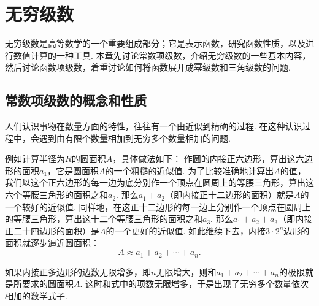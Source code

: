 \begingroup
\def\s{\sum\limits_{i=1}^{\infty}}
\def\sn{\sum\limits_{i=1}^n}
\def\l{\lim\limits_{n\to\infty}}
\def\tint{\int_{-\pi}^{\pi}}

\chapter{无穷级数}
无穷级数是高等数学的一个重要组成部分；它是表示函数，研究函数性质，以及进行数值计算的一种工具.
本章先讨论常数项级数，介绍无穷级数的一些基本内容，然后讨论函数项级数，着重讨论如何将函数展开成幂级数和三角级数的问题.

\section{常数项级数的概念和性质}
人们认识事物在数量方面的特性，往往有一个由近似到精确的过程.
在这种认识过程中，会遇到由有限个数量相加到无穷多个数量相加的问题.

例如计算半径为\(R\)的圆面积\(A\)，具体做法如下：
作圆的内接正六边形，算出这六边形的面积\(a_1\)，它是圆面积\(A\)的一个粗糙的近似值.
为了比较准确地计算出\(A\)的值，我们以这个正六边形的每一边为底分别作一个顶点在圆周上的等腰三角形，算出这六个等腰三角形的面积之和\(a_2\).
那么\(a_1+a_2\)（即内接正十二边形的面积）就是\(A\)的一个较好的近似值.
同样地，在这正十二边形的每一边上分别作一个顶点在圆周上的等腰三角形，算出这十二个等腰三角形的面积之和\(a_3\).
那么\(a_1+a_2+a_3\)（即内接正二十四边形的面积）是\(A\)的一个更好的近似值.
如此继续下去，内接\(3\cdot2^n\)边形的面积就逐步逼近圆面积：\[
A \approx a_1 + a_2 + \dotsb + a_n.
\]

如果内接正多边形的边数无限增多，即\(n\)无限增大，则和\(a_1+a_2+\dotsb+a_n\)的极限就是所要求的圆面积\(A\).
这时和式中的项数无限增多，于是出现了无穷多个数量依次相加的数学式子.

